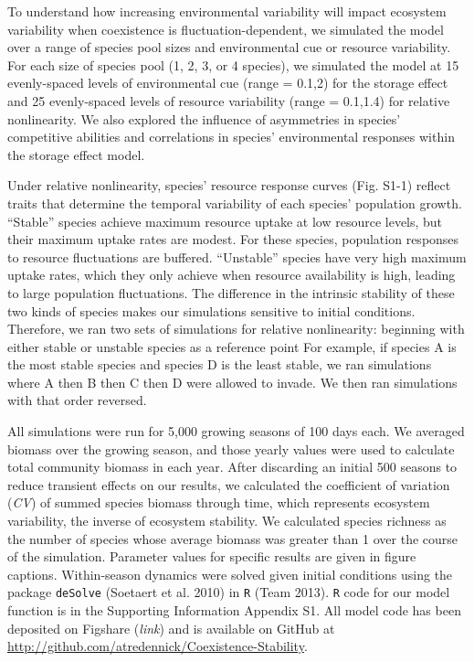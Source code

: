 \documentclass[12pt,]{article}
\begin{document}
To understand how increasing environmental variability will impact
ecosystem variability when coexistence is fluctuation-dependent, we
simulated the model over a range of species pool sizes and environmental
cue or resource variability. For each size of species pool (1, 2, 3, or
4 species), we simulated the model at 15 evenly-spaced levels of
environmental cue (range = 0.1,2) for the storage effect and 25
evenly-spaced levels of resource variability (range = 0.1,1.4) for
relative nonlinearity. We also explored the influence of asymmetries in
species' competitive abilities and correlations in species'
environmental responses within the storage effect model.

Under relative nonlinearity, species' resource response curves (Fig.
S1-1) reflect traits that determine the temporal variability of each
species' population growth. ``Stable'' species achieve maximum resource
uptake at low resource levels, but their maximum uptake rates are
modest. For these species, population responses to resource fluctuations
are buffered. ``Unstable'' species have very high maximum uptake rates,
which they only achieve when resource availability is high, leading to
large population fluctuations. The difference in the intrinsic stability
of these two kinds of species makes our simulations sensitive to initial
conditions. Therefore, we ran two sets of simulations for relative
nonlinearity: beginning with either stable or unstable species as a
reference point For example, if species A is the most stable species and
species D is the least stable, we ran simulations where A then B then C
then D were allowed to invade. We then ran simulations with that order
reversed.

All simulations were run for 5,000 growing seasons of 100 days each. We
averaged biomass over the growing season, and those yearly values were
used to calculate total community biomass in each year. After discarding
an initial 500 seasons to reduce transient effects on our results, we
calculated the coefficient of variation (\emph{CV}) of summed species
biomass through time, which represents ecosystem variability, the
inverse of ecosystem stability. We calculated species richness as the
number of species whose average biomass was greater than 1 over the
course of the simulation. Parameter values for specific results are
given in figure captions. Within-season dynamics were solved given
initial conditions using the package \texttt{deSolve} (Soetaert et al.
2010) in \texttt{R} (Team 2013). \texttt{R} code for our model function
is in the Supporting Information Appendix S1. All model code has been
deposited on Figshare (\emph{link}) and is available on GitHub at
\url{http://github.com/atredennick/Coexistence-Stability}.
\end{document}
